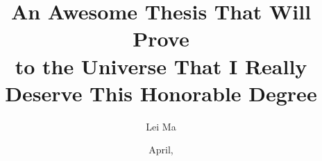 \documentclass[botnum, fleqn]{unmeethesis}
\begin{document}
\frontmatter




\title{An Awesome Thesis That Will Prove \\ to the Universe
       That I Really Deserve This Honorable Degree}

\author{Lei Ma}





\date{April, \thisyear}

\maketitle





\maketitleabstract %



\tableofcontents
\listoffigures
\listoftables




\mainmatter








\printbibliography

%
%


%
%
\end{document}
